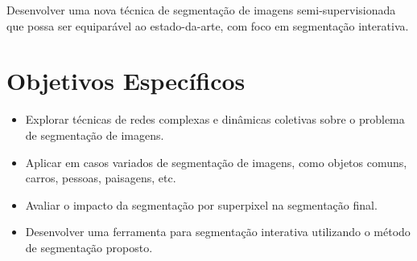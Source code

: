 Desenvolver uma nova técnica de segmentação de imagens
semi-supervisionada que possa ser equiparável ao estado-da-arte, com
foco em segmentação interativa.

\section{Objetivos Específicos}\label{sec:objetivo-geral}

\begin{itemize}
\item Explorar técnicas de redes complexas e dinâmicas coletivas sobre
  o problema de segmentação de imagens.
\item Aplicar em casos variados de segmentação de imagens, como
  objetos comuns, carros, pessoas, paisagens, etc.
\item Avaliar o impacto da segmentação por superpixel na segmentação final.
\item Desenvolver uma ferramenta para segmentação interativa
  utilizando o método de segmentação proposto.
\end{itemize}



